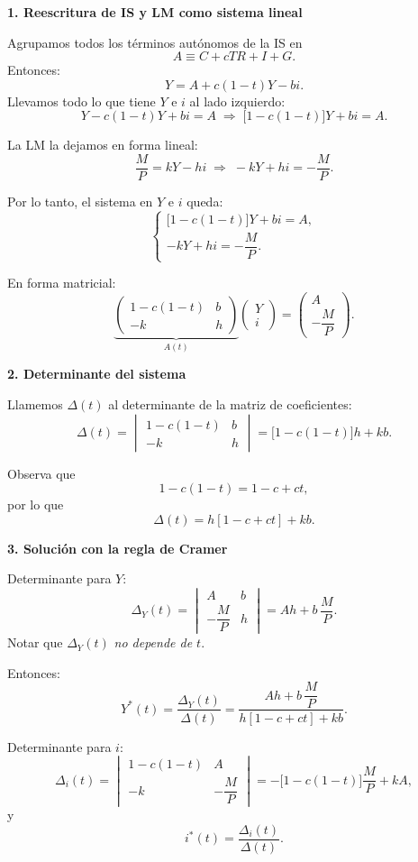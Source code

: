 \documentclass[11pt,addpoints]{article}
\begin{document}
\begin{enumerate}
\textbf{1. Reescritura de IS y LM como sistema lineal}

Agrupamos todos los términos autónomos de la IS en
\[
A \equiv C + cTR + I + G.
\]
Entonces:
\[
Y = A + c(1-t)Y - b i.
\]
Llevamos todo lo que tiene $Y$ e $i$ al lado izquierdo:
\[
Y - c(1-t)Y + b i = A
\;\Rightarrow\;
\big[1 - c(1-t)\big]Y + b i = A.
\]

La LM la dejamos en forma lineal:
\[
\frac{M}{P} = kY - h i
\;\Rightarrow\;
-kY + h i = -\frac{M}{P}.
\]

Por lo tanto, el sistema en $Y$ e $i$ queda:
\[
\begin{cases}
\big[1 - c(1-t)\big]Y + b i = A,\\[2pt]
-kY + h i = -\dfrac{M}{P}.
\end{cases}
\]

En forma matricial:
\[
\underbrace{\begin{pmatrix}
1 - c(1-t) & b \\
-k & h
\end{pmatrix}}_{A(t)}
\begin{pmatrix} Y \\[2pt] i \end{pmatrix}
=
\begin{pmatrix} A \\[2pt] -\dfrac{M}{P} \end{pmatrix}.
\]

\textbf{2. Determinante del sistema}

Llamemos $\Delta(t)$ al determinante de la matriz de coeficientes:
\[
\Delta(t) = 
\begin{vmatrix}
1 - c(1-t) & b \\
-k & h
\end{vmatrix}
= \big[1 - c(1-t)\big]h + kb.
\]

Observa que
\[
1 - c(1-t) = 1 - c + ct,
\]
por lo que
\[
\Delta(t) = h[1 - c + ct] + kb.
\]

\textbf{3. Solución con la regla de Cramer}

Determinante para $Y$:
\[
\Delta_Y(t) =
\begin{vmatrix}
A & b \\
-\dfrac{M}{P} & h
\end{vmatrix}
= Ah + b\,\frac{M}{P}.
\]
Notar que $\Delta_Y(t)$ \emph{no depende de $t$}.

Entonces:
\[
Y^*(t) = \frac{\Delta_Y(t)}{\Delta(t)}
= \frac{Ah + b\,\dfrac{M}{P}}{h[1 - c + ct] + kb}.
\]

\newpage
\vspace*{0.5cm}
Determinante para $i$:
\[
\Delta_i(t) =
\begin{vmatrix}
1 - c(1-t) & A \\
-k & -\dfrac{M}{P}
\end{vmatrix}
= -\big[1 - c(1-t)\big]\frac{M}{P} + kA,
\]
y
\[
i^*(t) = \frac{\Delta_i(t)}{\Delta(t)}.
\]


\end{enumerate}
\end{document}
